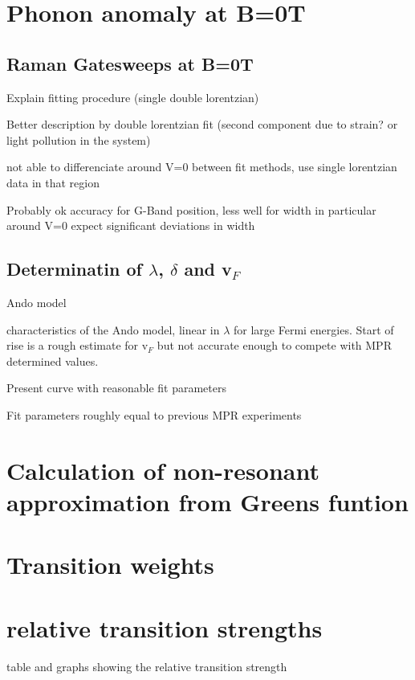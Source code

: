 \documentclass[prl,aps,superscriptaddress,preprint]{revtex4-1}
\begin{document}
\section{Phonon anomaly at B=0T}
\subsection{Raman Gatesweeps at B=0T}
Explain fitting procedure (single double lorentzian)

Better description by double lorentzian fit (second component due to strain? or light pollution in the system)

not able to differenciate around V=0 between fit methods, use single lorentzian data in that region

Probably ok accuracy for G-Band position, less well for width in particular around V=0 expect significant deviations in width
\subsection{Determinatin of $\lambda$, $\delta$ and v$_F$}
Ando model

characteristics of the Ando model, linear in $\lambda$ for large Fermi energies. Start of rise is a rough estimate for v$_F$ but not accurate enough to compete with MPR determined values.

Present curve with reasonable fit parameters

Fit parameters roughly equal to previous MPR experiments

\section{Calculation of non-resonant approximation from Greens funtion}

\section{Transition weights}

\section{relative transition strengths}

table and graphs showing the relative transition strength


 

\end{document}
